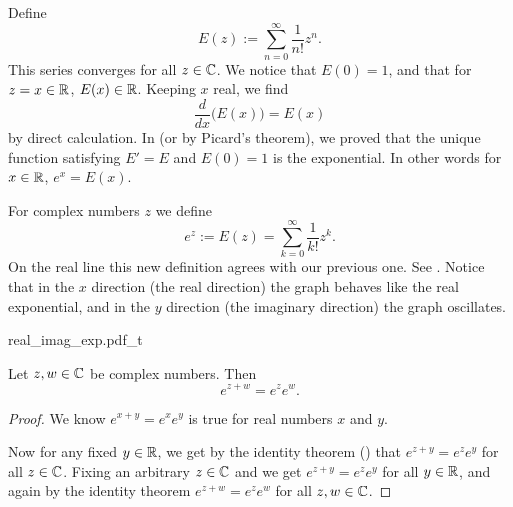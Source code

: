 Define
\begin{equation*}
E(z) := \sum_{n=0}^\infty \frac{1}{n!} z^n .
\end{equation*}
This series converges for all $z \in {\mathbb{C}}$.   We notice that $E(0) = 1$,
and that for $z=x \in {\mathbb{R}}$, $E(x) \in {\mathbb{R}}$.  Keeping $x$ real, we find
\begin{equation*}
\frac{d}{dx} \bigl( E(x) \bigr) = E(x)
\end{equation*}
by direct calculation.
In  (or by Picard's theorem), we proved that
the unique function satisfying $E' = E$ and
$E(0) = 1$ is the exponential.  In other words for $x \in {\mathbb{R}}$, $e^x = E(x)$.

For complex numbers $z$ we define
\begin{equation*}
e^z := E(z) = 
\sum_{k=0}^\infty \frac{1}{k!} z^k .
\end{equation*}
On the real line this new definition agrees with our previous one.
See .  Notice that in the $x$ direction
(the real direction)
the graph behaves like the real exponential, and in the $y$ direction
(the imaginary direction) the graph oscillates.

\begin{myfigureht}
{real_imag_exp.pdf_t}
\caption{Graphs of the real part (left) and imaginary part (right)
of the complex exponential $e^z = e^{x+iy}$.  The $x$-axis goes from $-4$ to
$4$, the $y$-axis goes from $-6$ to $6$, and the vertical axis goes from
$-e^{6} \approx -54.6$
to
$e^{6} \approx 54.6$.  The plot of the real exponential ($y=0$)
is marked in a bold line.\label{fig:complexexpgraphs}}
\end{myfigureht}

\begin{prop}
Let $z,w \in {\mathbb{C}}$ be complex numbers.  Then
\begin{equation*}
e^{z+w} = e^z e^w.
\end{equation*}
\end{prop}

\begin{proof}
We know
$e^{x+y} = e^x e^y$ is true for
real numbers $x$ and $y$.

Now for any fixed $y \in {\mathbb{R}}$, we get by the
identity theorem () that
$e^{z+y} = e^ze^y$ for all $z \in {\mathbb{C}}$.  Fixing an arbitrary $z \in {\mathbb{C}}$
and we get
$e^{z+y} = e^ze^y$ for all $y \in {\mathbb{R}}$, and again by the identity theorem 
$e^{z+w} = e^z e^w$
for all $z,w \in {\mathbb{C}}$.
\end{proof}


